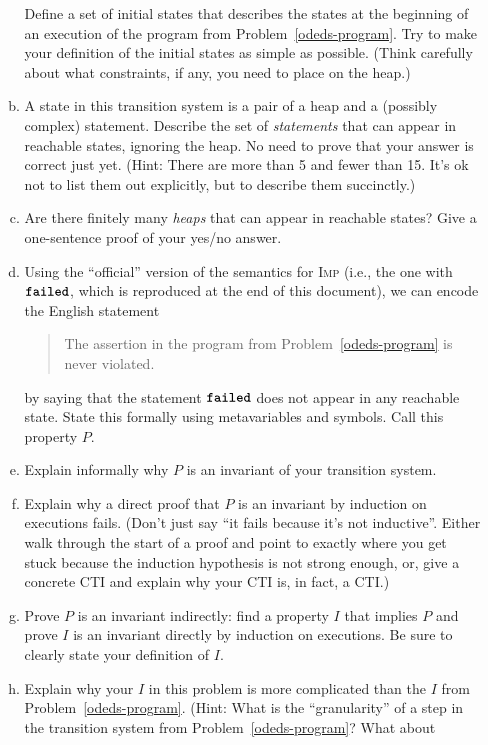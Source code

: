 \documentclass{article}
\newcommand{\imp}{\textsc{Imp}}
\newcommand{\failed}{\ensuremath{\text{\ttfamily\bfseries failed}}}
\begin{document}
\begin{enumerate}[leftmargin=*,itemindent=*,start=1,label={{\bf Problem \arabic*}.},ref=\arabic*]
\begin{enumerate}[(a)]
    Define a set of initial states that describes the states at the beginning of
    an execution of the program from Problem~\ref{odeds-program}. Try to make
    your definition of the initial states as simple as possible. (Think
    carefully about what constraints, if any, you need to place on the heap.)
  \item\label{reach-stmts} A state in this transition system is a pair of a heap and a (possibly
    complex) statement. Describe the set of \emph{statements} that can appear in
    reachable states, ignoring the heap. No need to prove that your answer is correct just yet.
    (Hint: There are more than 5 and fewer than 15.
    It's ok not to list them out explicitly, but to describe them succinctly.)
  \item Are there finitely many \emph{heaps} that can appear in reachable states?
    Give a one-sentence proof of your yes/no answer.
  \item Using the ``official'' version of the semantics for \imp{} (i.e., the
    one with \failed{}, which is reproduced at the end of this document), we can
    encode the English statement
    \begin{quote}
      The assertion in the program from Problem~\ref{odeds-program} is never
      violated.
    \end{quote}
    by saying that the statement \failed{} does not appear in any reachable
    state. State this formally using metavariables and symbols. Call this
    property $P$.
  \item Explain informally why $P$ is an invariant of your transition system.
  \item Explain why a direct proof that $P$ is an invariant by induction on
    executions fails. (Don't just say ``it fails because it's not inductive''.
    Either walk through the start of a proof and point to exactly
    where you get stuck because the induction hypothesis is not strong
    enough, or, give a concrete CTI and explain why your CTI is, in fact, a CTI.)
  \item\label{opsem-ind-proof} Prove $P$ is an invariant indirectly: find a property $I$ that implies
    $P$ and prove $I$ is an invariant directly by induction on executions. Be
    sure to clearly state your definition of $I$.
  \item Explain why your $I$ in this problem is more complicated than the $I$
    from Problem~\ref{odeds-program}. (Hint: What is the ``granularity'' of a
    step in the transition system from Problem~\ref{odeds-program}? What about

\end{enumerate}
\end{enumerate}
\end{document}

